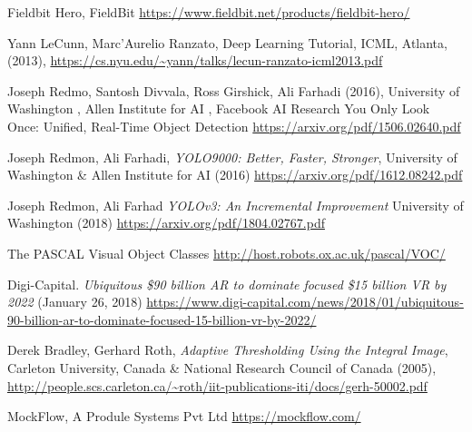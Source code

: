 \begin{thebibliography}{X}
Fieldbit Hero, FieldBit
\url{https://www.fieldbit.net/products/fieldbit-hero/}

Yann LeCunn, Marc'Aurelio Ranzato, Deep Learning Tutorial, ICML, Atlanta, (2013), 
\url{https://cs.nyu.edu/~yann/talks/lecun-ranzato-icml2013.pdf}

Joseph Redmo, Santosh Divvala, Ross Girshick, Ali Farhadi (2016), University of Washington
, Allen Institute for AI
, Facebook AI Research
You Only Look Once: Unified, Real-Time Object Detection
\url{https://arxiv.org/pdf/1506.02640.pdf} 

Joseph Redmon, Ali Farhadi, \textit{YOLO9000:
Better, Faster, Stronger}, 
University of Washington \& Allen Institute for AI (2016)
\url{https://arxiv.org/pdf/1612.08242.pdf}

Joseph Redmon, Ali Farhad
\textit{YOLOv3: An Incremental Improvement}
University of Washington (2018)
\url{https://arxiv.org/pdf/1804.02767.pdf}

The PASCAL Visual Object Classes
\url{http://host.robots.ox.ac.uk/pascal/VOC/}

Digi-Capital. \textit{Ubiquitous  \$90 billion AR to dominate focused \$15 billion VR by 2022}
(January 26, 2018)
\url{https://www.digi-capital.com/news/2018/01/ubiquitous-90-billion-ar-to-dominate-focused-15-billion-vr-by-2022/}

Derek Bradley, Gerhard Roth, \textit{Adaptive Thresholding Using the Integral Image},
Carleton University, Canada \& National Research Council of Canada (2005), 
\url{http://people.scs.carleton.ca/~roth/iit-publications-iti/docs/gerh-50002.pdf}

MockFlow,  A Produle Systems Pvt Ltd 
 \url{https://mockflow.com/}

\end{thebibliography}
